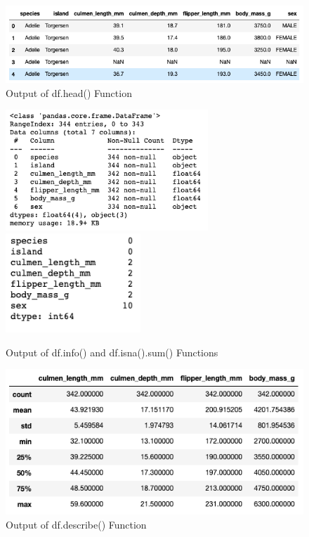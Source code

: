 \documentclass[12pt]{article}
\begin{document}
\begin{figure}[H]
    \centering
    \includegraphics[width=5in]{Figures/penguins/df.head().png}
    \caption{Output of df.head() Function}
    \label{fig_df.head()}
\end{figure}

\begin{figure}[H]
    \centering
    \includegraphics[width=3in]{Figures/penguins/df.info().png}
    \includegraphics[width=2in]{Figures/penguins/df.isna().sum().png}
    \caption{Output of df.info() and df.isna().sum() Functions}
    \label{fig_df.info()_df.isna().sum()}
\end{figure}

\begin{figure}[H]
    \centering
    \includegraphics[width=5in]{Figures/penguins/df.describe().png}
    \caption{Output of df.describe() Function}
    \label{fig_df.describe()}
\end{figure}
\end{document}
